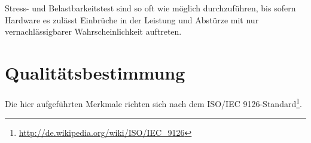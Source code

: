 \documentclass{article}
\begin{document}
\begin{T}[start = 10]
 \item Stress- und Belastbarkeitstest sind so oft wie möglich durchzuführen, bis sofern Hardware es zulässt 
       Einbrüche in der Leistung und Abstürze mit nur vernachlässigbarer Wahrscheinlichkeit auftreten.
\end{T}

\section{Qualitätsbestimmung}

Die hier aufgeführten Merkmale richten sich nach dem ISO/IEC 9126-Standard\footnote{\url{http://de.wikipedia.org/wiki/ISO/IEC_9126}}.

\end{document}
